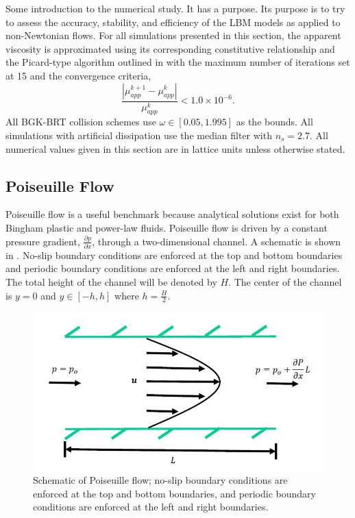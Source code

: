 \documentclass[pdftex,ms]{pittetd}
\begin{document}
Some introduction to the numerical study.
It has a purpose.
Its purpose is to try to assess the accuracy, stability, and efficiency of the LBM models as applied to non-Newtonian flows.
For all simulations presented in this section, the apparent viscosity is approximated using its corresponding constitutive relationship and the Picard-type algorithm outlined in  with the maximum number of iterations set at 15 and the convergence criteria,
\begin{equation} \label{eq:mu-app-conv}
\frac{\left|\mu_{app}^{k+1} - \mu_{app}^{k}\right|}{\mu_{app}^{k}} < 1.0 \times 10^{-6}.
\end{equation}
All BGK-BRT collision schemes use $\omega \in [0.05, 1.995]$ as the bounds.
All simulations with artificial dissipation use the median filter with $n_s = 2.7$.
All numerical values given in this section are in lattice units unless otherwise stated.

\newcommand{\pgrad}{\frac{\partial p}{\partial x}}

\subsection{Poiseuille Flow}

Poiseuille flow is a useful benchmark because analytical solutions exist for both Bingham plastic and power-law fluids.
Poiseuille flow is driven by a constant pressure gradient, $\pgrad$, through a two-dimensional channel.
A schematic is shown in .
No-slip boundary conditions are enforced at the top and bottom boundaries and periodic boundary conditions are enforced at the left and right boundaries.
The total height of the channel will be denoted by $H$.
The center of the channel is $y = 0$ and $y \in [-h, h]$ where $h = \frac{H}{2}$.

\begin{figure}
	\centering
    \includegraphics[width=\linewidth]{figs/poise-schematic}
    \caption{Schematic of Poiseuille flow; no-slip boundary conditions are enforced at the top and bottom boundaries, and periodic boundary conditions are enforced at the left and right boundaries.}
    \label{fig:poise-schematic}
\end{figure}
\end{document}
